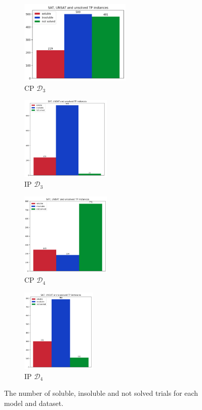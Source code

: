 \documentclass{mpaper}
\begin{document}
\begin{figure}
    \centering
    \begin{subfigure}[b]{0.22\textwidth}
        \includegraphics[width=\textwidth, height=4cm]{cpipexperiments/cp_d.png}
        \caption{CP $\mathcal{D}_3$}
        \label{fig:cp_d}
    \end{subfigure}
    \begin{subfigure}[b]{0.22\textwidth}
        \includegraphics[width=\textwidth, height=4cm]{cpipexperiments/ip_d.png}
        \caption{IP $\mathcal{D}_3$}
        \label{fig:ip_d}
    \end{subfigure}
    \begin{subfigure}[b]{0.22\textwidth}
        \includegraphics[width=\textwidth, height=4cm]{cpipexperiments/cp_d2.png}
        \caption{CP $\mathcal{D}_4$}
        \label{fig:cp_d2}
    \end{subfigure}
    \begin{subfigure}[b]{0.22\textwidth}
        \includegraphics[width=\textwidth, height=4cm]{cpipexperiments/ip_d2.png}
        \caption{IP $\mathcal{D}_4$}
        \label{fig:ip_d2}
    \end{subfigure}
    \caption{The number of soluble, insoluble and not solved trials for each model and dataset.}
    \label{fig:dandd2solvability}
\end{figure}
\end{document}
